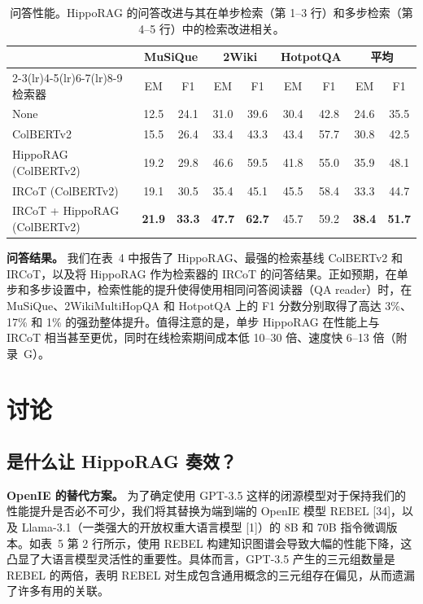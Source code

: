 \documentclass[11pt,UTF8,fontset=fandol]{ctexart}
\begin{document}
\begin{table}[H]\centering
\caption{问答性能。HippoRAG 的问答改进与其在单步检索（第 1--3 行）和多步检索（第 4--5 行）中的检索改进相关。}
\label{tab:4}
\begin{tabular}{lcccccccc}
\toprule
 & \multicolumn{2}{c}{MuSiQue} & \multicolumn{2}{c}{2Wiki} & \multicolumn{2}{c}{HotpotQA} & \multicolumn{2}{c}{平均} \\
\cmidrule(lr){2-3}\cmidrule(lr){4-5}\cmidrule(lr){6-7}\cmidrule(lr){8-9}
检索器 & EM & F1 & EM & F1 & EM & F1 & EM & F1 \\
\midrule
None & 12.5 & 24.1 & 31.0 & 39.6 & 30.4 & 42.8 & 24.6 & 35.5 \\
ColBERTv2 & 15.5 & 26.4 & 33.4 & 43.3 & 43.4 & 57.7 & 30.8 & 42.5 \\
HippoRAG (ColBERTv2) & 19.2 & 29.8 & 46.6 & 59.5 & 41.8 & 55.0 & 35.9 & 48.1 \\
IRCoT (ColBERTv2) & 19.1 & 30.5 & 35.4 & 45.1 & 45.5 & 58.4 & 33.3 & 44.7 \\
IRCoT + HippoRAG (ColBERTv2) & \textbf{21.9} & \textbf{33.3} & \textbf{47.7} & \textbf{62.7} & 45.7 & 59.2 & \textbf{38.4} & \textbf{51.7} \\
\bottomrule
\end{tabular}
\end{table}

\textbf{问答结果。} 我们在表~4 中报告了 HippoRAG、最强的检索基线 ColBERTv2 和 IRCoT，以及将 HippoRAG 作为检索器的 IRCoT 的问答结果。正如预期，在单步和多步设置中，检索性能的提升使得使用相同问答阅读器（QA reader）时，在 MuSiQue、2WikiMultiHopQA 和 HotpotQA 上的 F1 分数分别取得了高达 3\%、17\% 和 1\% 的强劲整体提升。值得注意的是，单步 HippoRAG 在性能上与 IRCoT 相当甚至更优，同时在线检索期间成本低 10--30 倍、速度快 6--13 倍（附录~G）。

\section{讨论}
\subsection{是什么让 HippoRAG 奏效？}

\textbf{OpenIE 的替代方案。} 为了确定使用 GPT-3.5 这样的闭源模型对于保持我们的性能提升是否必不可少，我们将其替换为端到端的 OpenIE 模型 REBEL [34]，以及 Llama-3.1（一类强大的开放权重大语言模型 [1]）的 8B 和 70B 指令微调版本。如表~5 第 2 行所示，使用 REBEL 构建知识图谱会导致大幅的性能下降，这凸显了大语言模型灵活性的重要性。具体而言，GPT-3.5 产生的三元组数量是 REBEL 的两倍，表明 REBEL 对生成包含通用概念的三元组存在偏见，从而遗漏了许多有用的关联。
\end{document}
